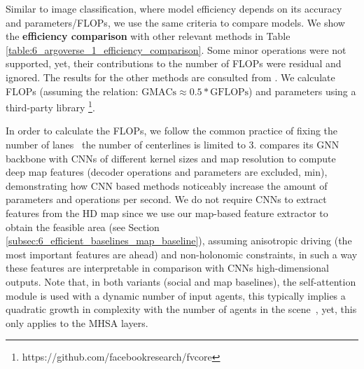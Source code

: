 Similar to image classification, where model efficiency depends on its accuracy and parameters/\acp{FLOP}, we use the same criteria to compare models. We show the \textbf{efficiency comparison} with other relevant methods in Table \ref{table:6_argoverse_1_efficiency_comparison}. Some minor operations were not supported, yet, their contributions to the number of \acp{FLOP} were residual and ignored. The results for the other methods are consulted from \cite{gilles2021home} \cite{gilles2022gohome} \cite{gao2020vectornet} \cite{he2022multi}. We calculate \acp{FLOP} (assuming the relation: $\text{GMACs} \approx 0.5 * \text{GFLOPs}$) and parameters using a third-party library \footnote{https://github.com/facebookresearch/fvcore}.

In order to calculate the FLOPs, we follow the common practice \cite{gao2020vectornet} \cite{gu2021densetnt} \cite{gilles2022gohome} of fixing the number of lanes \ie \ the number of centerlines is limited to 3. %
%
\cite{gao2020vectornet} compares its GNN backbone with CNNs of different kernel sizes and map resolution to compute deep map features (decoder operations and parameters are excluded, min), demonstrating how CNN based methods noticeably increase the amount of parameters and operations per second. We do not require CNNs to extract features from the HD map since we use our map-based feature extractor to obtain the feasible area (see Section \ref{subsec:6_efficient_baselines_map_baseline}), assuming anisotropic driving (the most important features are ahead) and non-holonomic constraints, in such a way these features are interpretable in comparison with CNNs high-dimensional outputs. Note that, in both variants (social and map baselines), the self-attention module is used with a dynamic number of input agents, this typically implies a quadratic growth in complexity with the number of agents in the scene~\cite{vaswani2017attention}, yet, this only applies to the MHSA layers.

